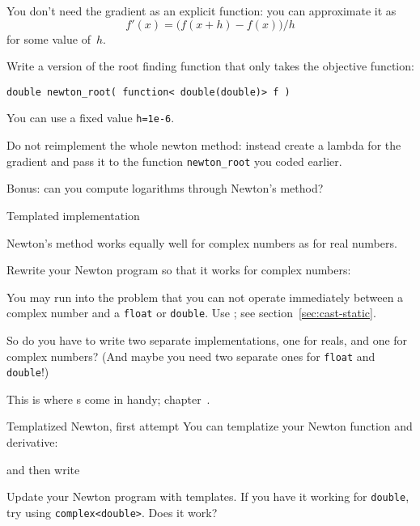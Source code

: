 \begin{exercise}
  \label{ex:newton-capture-diff}
  You don't need the gradient as an explicit function:
  you can approximate it as
  \[ f'(x) = \bigl( f(x+h)-f(x) \bigr) /h \]
  for some value of~$h$.

  Write a version of the root finding function
  that only takes the objective function:
\begin{lstlisting}
double newton_root( function< double(double)> f ) 
\end{lstlisting}
You can use a fixed value \lstinline+h=1e-6+.

Do not reimplement the whole newton method:
instead create a lambda for the gradient and pass it to the
function \lstinline+newton_root+ you coded earlier.
\end{exercise}

\begin{exercise}
  Bonus: can you compute logarithms through Newton's method?
\end{exercise}

 {Templated implementation}
\label{sec:newton-template}

Newton's method works equally well for complex numbers as for real numbers.

\begin{exercise}
  \label{ex:newton-cplx}
  Rewrite your Newton program so that it works for complex numbers:

  You may run into the problem that
  you can not operate immediately between a complex number
  and a \lstinline{float} or \lstinline{double}.
  Use ; see section~\ref{sec:cast-static}.
\end{exercise}

So do you have to write two separate implementations, one for reals,
and one for complex numbers?
(And maybe you need two separate ones for \lstinline{float} and \lstinline{double}!)

This is where s come in handy; chapter~.
\begin{plainblock}{Templatized Newton, first attempt}
  \label{sl:newt-template}
  You can templatize your Newton function and derivative:

  and then write
\end{plainblock}

\begin{exercise}
  \label{ex:newt-template1}
  Update your Newton program with templates.
  If you have it working for \lstinline{double},
  try using \lstinline{complex<double>}.
  Does it work?
\end{exercise}

